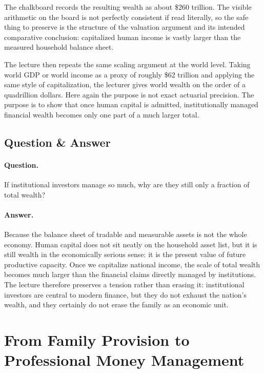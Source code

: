 \begin{remark}
The chalkboard records the resulting wealth as about \$260 trillion. The visible arithmetic on the board is not perfectly consistent if read literally, so the safe thing to preserve is the structure of the valuation argument and its intended comparative conclusion: capitalized human income is vastly larger than the measured household balance sheet.
\end{remark}

The lecture then repeats the same scaling argument at the world level. Taking world GDP or world income as a proxy of roughly \$62 trillion and applying the same style of capitalization, the lecturer gives world wealth on the order of a quadrillion dollars. Here again the purpose is not exact actuarial precision. The purpose is to show that once human capital is admitted, institutionally managed financial wealth becomes only one part of a much larger total.

\subsection{Question \& Answer}

\paragraph{Question.} If institutional investors manage so much, why are they still only a fraction of total wealth?

\paragraph{Answer.} Because the balance sheet of tradable and measurable assets is not the whole economy. Human capital does not sit neatly on the household asset list, but it is still wealth in the economically serious sense: it is the present value of future productive capacity. Once we capitalize national income, the scale of total wealth becomes much larger than the financial claims directly managed by institutions. The lecture therefore preserves a tension rather than erasing it: institutional investors are central to modern finance, but they do not exhaust the nation's wealth, and they certainly do not erase the family as an economic unit.

\section{From Family Provision to Professional Money Management}

